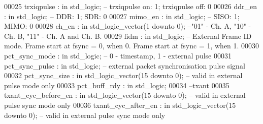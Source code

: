 \begin{DoxyCode}
00025       \textcolor{vhdlchar}{trxiqpulse}           \textcolor{vhdlchar}{:} \textcolor{keywordflow}{in} \textcolor{comment}{std\_logic};\textcolor{keyword}{ -- trxiqpulse on: 1; trxiqpulse off: 0}
00026       \textcolor{vhdlchar}{ddr_en}               \textcolor{vhdlchar}{:} \textcolor{keywordflow}{in} \textcolor{comment}{std\_logic};\textcolor{keyword}{ -- DDR: 1; SDR: 0}
00027       \textcolor{vhdlchar}{mimo_en}              \textcolor{vhdlchar}{:} \textcolor{keywordflow}{in} \textcolor{comment}{std\_logic};\textcolor{keyword}{ -- SISO: 1; MIMO: 0}
00028       \textcolor{vhdlchar}{ch_en}                \textcolor{vhdlchar}{:} \textcolor{keywordflow}{in} \textcolor{comment}{std\_logic\_vector}\textcolor{vhdlchar}{(}\textcolor{vhdllogic}{}\textcolor{vhdllogic}{1} \textcolor{keywordflow}{downto} \textcolor{vhdllogic}{}\textcolor{vhdllogic}{0}\textcolor{vhdlchar}{)};\textcolor{keyword}{ --"01" - Ch. A, "10" - Ch. B, "11" - Ch. A
       and Ch. B. }
00029       \textcolor{vhdlchar}{fidm}                 \textcolor{vhdlchar}{:} \textcolor{keywordflow}{in} \textcolor{comment}{std\_logic};\textcolor{keyword}{ -- External Frame ID mode. Frame start at fsync = 0, when 0.
       Frame start at fsync = 1, when 1.}
00030       \textcolor{vhdlchar}{pct_sync_mode}        \textcolor{vhdlchar}{:} \textcolor{keywordflow}{in} \textcolor{comment}{std\_logic};\textcolor{keyword}{ -- 0 - timestamp, 1 - external pulse }
00031       \textcolor{vhdlchar}{pct_sync_pulse}       \textcolor{vhdlchar}{:} \textcolor{keywordflow}{in} \textcolor{comment}{std\_logic};\textcolor{keyword}{ -- external packet synchronisation pulse signal}
00032       \textcolor{vhdlchar}{pct_sync_size}        \textcolor{vhdlchar}{:} \textcolor{keywordflow}{in} \textcolor{comment}{std\_logic\_vector}\textcolor{vhdlchar}{(}\textcolor{vhdllogic}{}\textcolor{vhdllogic}{15} \textcolor{keywordflow}{downto} \textcolor{vhdllogic}{}\textcolor{vhdllogic}{0}\textcolor{vhdlchar}{)};\textcolor{keyword}{ -- valid in external pulse mode only}
00033       \textcolor{vhdlchar}{pct_buff_rdy}         \textcolor{vhdlchar}{:} \textcolor{keywordflow}{in} \textcolor{comment}{std\_logic};
00034 \textcolor{keyword}{      --txant}
00035       \textcolor{vhdlchar}{txant_cyc_before_en}  \textcolor{vhdlchar}{:} \textcolor{keywordflow}{in} \textcolor{comment}{std\_logic\_vector}\textcolor{vhdlchar}{(}\textcolor{vhdllogic}{}\textcolor{vhdllogic}{15} \textcolor{keywordflow}{downto} \textcolor{vhdllogic}{}\textcolor{vhdllogic}{0}\textcolor{vhdlchar}{)};\textcolor{keyword}{ -- valid in external pulse sync mode only}
00036       \textcolor{vhdlchar}{txant_cyc_after_en}   \textcolor{vhdlchar}{:} \textcolor{keywordflow}{in} \textcolor{comment}{std\_logic\_vector}\textcolor{vhdlchar}{(}\textcolor{vhdllogic}{}\textcolor{vhdllogic}{15} \textcolor{keywordflow}{downto} \textcolor{vhdllogic}{}\textcolor{vhdllogic}{0}\textcolor{vhdlchar}{)};\textcolor{keyword}{ -- valid in external pulse sync mode only }

\end{DoxyCode}
